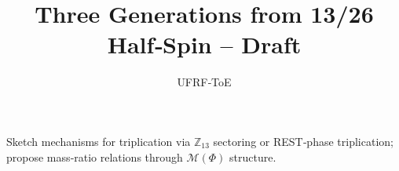 \documentclass[11pt]{article}
\title{Three Generations from 13/26 Half‑Spin -- Draft}
\author{UFRF‑ToE}
\begin{document}
\maketitle
Sketch mechanisms for triplication via $\mathbb{Z}_{13}$ sectoring or REST‑phase triplication; propose mass‑ratio relations through $\mathcal{M}(\Phi)$ structure.
\end{document}
